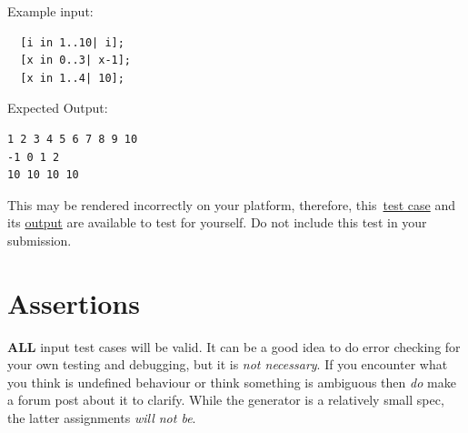\documentclass{article}
\begin{document}
Example input:
\begin{lstlisting}
  [i in 1..10| i];
  [x in 0..3| x-1];
  [x in 1..4| 10];
\end{lstlisting}

Expected Output:
\begin{lstlisting}
1 2 3 4 5 6 7 8 9 10
-1 0 1 2
10 10 10 10
\end{lstlisting}

This may be rendered incorrectly on your platform, therefore, this\
\href{https://webdocs.cs.ualberta.ca/\%7Ec415/generator/static/ex.in} {test case} and its
\href{https://webdocs.cs.ualberta.ca/\%7Ec415/generator/static/ex.out} {output} are available to
test for yourself. Do not include this test in your submission.

\section{Assertions}
\textbf{ALL} input test cases will be valid. It can be a good idea to do error checking for your
own testing and debugging, but it is \textit{not necessary}. If you encounter what you think is
undefined behaviour or think something is ambiguous then \textit{do} make a forum post about it to
clarify. While the generator is a relatively small spec, the latter assignments \textit{will not
be}.
\end{document}

